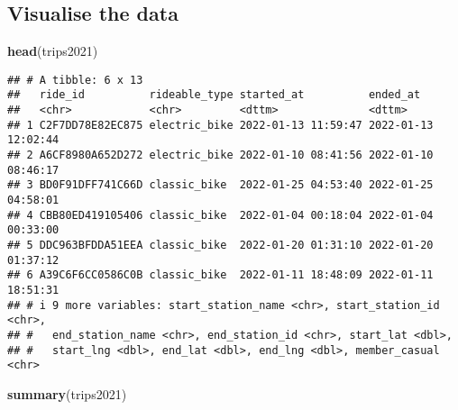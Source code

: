 \documentclass[
]{article}
\newenvironment{Shaded}{\begin{snugshade}}{\end{snugshade}}
\newcommand{\FunctionTok}[1]{\textcolor[rgb]{0.13,0.29,0.53}{\textbf{#1}}}
\newcommand{\NormalTok}[1]{#1}
\begin{document}
\hypertarget{visualise-the-data}{%
\subsection{Visualise the data}\label{visualise-the-data}}

\begin{Shaded}
\begin{Highlighting}[]
\FunctionTok{head}\NormalTok{(trips2021)}
\end{Highlighting}
\end{Shaded}

\begin{verbatim}
## # A tibble: 6 x 13
##   ride_id          rideable_type started_at          ended_at           
##   <chr>            <chr>         <dttm>              <dttm>             
## 1 C2F7DD78E82EC875 electric_bike 2022-01-13 11:59:47 2022-01-13 12:02:44
## 2 A6CF8980A652D272 electric_bike 2022-01-10 08:41:56 2022-01-10 08:46:17
## 3 BD0F91DFF741C66D classic_bike  2022-01-25 04:53:40 2022-01-25 04:58:01
## 4 CBB80ED419105406 classic_bike  2022-01-04 00:18:04 2022-01-04 00:33:00
## 5 DDC963BFDDA51EEA classic_bike  2022-01-20 01:31:10 2022-01-20 01:37:12
## 6 A39C6F6CC0586C0B classic_bike  2022-01-11 18:48:09 2022-01-11 18:51:31
## # i 9 more variables: start_station_name <chr>, start_station_id <chr>,
## #   end_station_name <chr>, end_station_id <chr>, start_lat <dbl>,
## #   start_lng <dbl>, end_lat <dbl>, end_lng <dbl>, member_casual <chr>
\end{verbatim}

\begin{Shaded}
\begin{Highlighting}[]
\FunctionTok{summary}\NormalTok{(trips2021)}
\end{Highlighting}
\end{Shaded}
\end{document}
